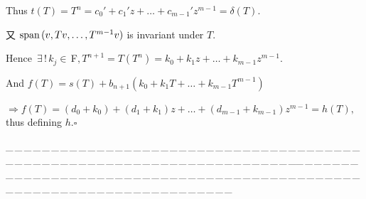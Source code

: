 \documentclass[a4paper, 11pt, UTF8]{article}
\def\Spn{\textup{span}\,}
\def\Fbfc{$\,{\timesbf F}$}
\begin{document}
\begin{large}
Thus $t(T)=T^n=c_0'+c_1'z+\dots+c_{m-1}'z^{m-1}=\delta(T).$\par\qquad
又 $\Spn(v,Tv,\dots,T^{m-1}v)$ is invariant under $T.$\par\qquad Hence $\,\exists\,!\,k_j\in\Fbfc,T^{n+1}=T(T^n)=k_0+k_1 z+\dots+k_{m-1}z^{m-1}.$\par\qquad
And $f(T)=s(T)+b_{n+1}(k_0+k_1 T+\dots+k_{m-1}T^{m-1})$\par\qquad
$\Rightarrow f(T)=(d_0+k_0)+(d_1+k_1)z+\dots+(d_{m-1}+k_{m-1})z^{m-1}=h(T),$ thus defining $h$.\quad$\square$\par
{\tiny \_\,\_\,\_\,\_\,\_\,\_\,\_\,\_\,\_\,\_\,\_\,\_\,\_\,\_\,\_\,\_\,\_\,\_\,\_\,\_\,\_\,\_\,\_\,\_\,\_\,\_\,\_\,\_\,\_\,\_\,\_\,\_\,\_\,\_\,\_\,\_\,\_\,\_\,\_\,\_\,\_\,\_\,\_\,\_\,\_\,\_\,\_\,\_\,\_\,\_\,\_\,\_\,\_\,\_\,\_\,\_\,\_\,\_\,\_\,\_\,\_\,\_\,\_\,\_\,\_\,\_\,\_\,\_\,\_\,\_\,\_\_\,\_\,\_\,\_\,\_\,\_\,\_\,\_\,\_\,\_\,\_\,\_\,\_\,\_\,\_\,\_\,\_\,\_\,\_\,\_\,\_\,\_\,\_\,\_\,\_\,\_\,\_\,\_\,\_\,\_\,\_\,\_\,\_\,\_\,\_\,\_\,\_\,\_\,\_\,\_\,\_\,\_\,\_\,\_\,\_\,\_\,\_\,\_\,\_\,\_\,\_\,\_\,\_\,\_\,\_\,\_\,\_\,\_\,\_\,\_\,\_\,\_\,\_\,\_\,\_\,\_\,\_\,\_\,\_\,\_\,\_}\par


\end{large}
\end{document}
